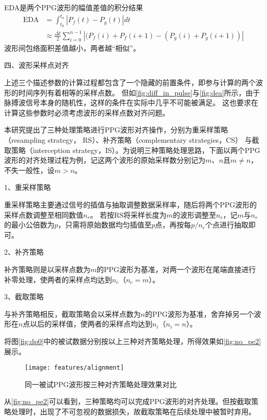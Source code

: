 EDA是两个PPG波形的幅值差值的积分结果
\begin{equation}
    \label{equ:dea}
    \begin{aligned}
        \text{EDA} &= \int_{t_0}^{t_n}|P_f(t)-P_g(t)|dt\\
        &\approx \frac{\Delta t}{2} \sum_{i=0}^{n-1}{|(P_f(i)+P_f(i+1)-(P_g(i)+P_g(i+1))|}
    \end{aligned}
\end{equation}
波形间包络面积差值越小，两者越“相似”。

四、波形采样点对齐

上述三个描述参数的计算过程都包含了一个隐藏的前置条件，即参与计算的两个波形的时间序列有着相等的采样点数。
但如\autoref{fig:diff_in_pulse}与\autoref{fig:dea}所示，由于脉搏波信号本身的随机性，这样的条件在实际中几乎不可能被满足。
这也要求在计算这些参数时必须考虑波形的采样点数对齐问题。

本研究提出了三种处理策略进行PPG波形对齐操作，分别为重采样策略（resampling strategy， RS）、补齐策略（complementary strategies，CS）
与截取策略（interception strategy，IS）。为说明三种策略处理思路，下面以两个PPG波形的对齐处理过程为例，记这两个波形的原始采样数分别记为$m$、$n$且$m \neq n$，不失一般性，设$m>n$。

1、重采样策略

重采样策略主要通过信号的插值与抽取调整数据采样率，随后将两个PPG波形的采样点数调整至相同数值$n_r$。
若按RS将采样长度为$m$的波形调整至$n_r$，记$m$与$n_r$的最小公倍数为$p$，只需将原始数据均匀插值至$p$点，再按每$p/n_r$个点进行抽取即可。

2、补齐策略

补齐策略则是以采样点数为$m$的PPG波形为基准，对两一个波形在尾端直接进行补零处理，使两者的采样点均达到$n_c$（$n_c=m$）。

3、截取策略

与补齐策略相反，截取策略会以采样点数为$n$的PPG波形为基准，舍弃掉另一个波形在$n$点以后的采样值，使两者的采样点均达到$n_i$（$n_i=n$）。

将图\autoref{fig:dp0}中的被试数据分别按以上三种对齐策略处理，所得效果如\autoref{fig:no_pe2}展示。

\begin{figure}[htbp]
  \centering
  \texttt{[image: features/alignment]}
  \caption{\label{fig:no_pe2}同一被试PPG波形按三种对齐策略处理效果对比}
\end{figure}

从\autoref{fig:no_pe2}可以看到，三种策略均可以完成PPG波形的对齐处理。但按截取策略处理时，出现了不可忽视的数据损失，故截取策略在后续处理中被暂时弃用。

